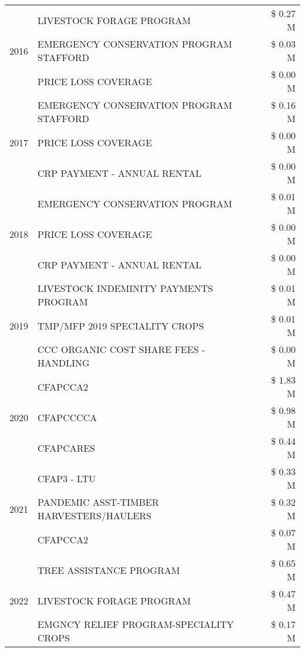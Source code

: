 \begin{tabular}{llr}
\cline{1-3}
\multirow[t]{3}{*}{2016} & LIVESTOCK FORAGE PROGRAM & \$ 0.27 M \\
 & EMERGENCY CONSERVATION PROGRAM STAFFORD & \$ 0.03 M \\
 & PRICE LOSS COVERAGE & \$ 0.00 M \\
\cline{1-3}
\multirow[t]{3}{*}{2017} & EMERGENCY CONSERVATION PROGRAM STAFFORD & \$ 0.16 M \\
 & PRICE LOSS COVERAGE & \$ 0.00 M \\
 & CRP PAYMENT - ANNUAL RENTAL & \$ 0.00 M \\
\cline{1-3}
\multirow[t]{3}{*}{2018} & EMERGENCY CONSERVATION PROGRAM & \$ 0.01 M \\
 & PRICE LOSS COVERAGE & \$ 0.00 M \\
 & CRP PAYMENT - ANNUAL RENTAL & \$ 0.00 M \\
\cline{1-3}
\multirow[t]{3}{*}{2019} & LIVESTOCK INDEMINITY PAYMENTS PROGRAM & \$ 0.01 M \\
 & TMP/MFP 2019 SPECIALITY CROPS & \$ 0.01 M \\
 & CCC ORGANIC COST SHARE FEES - HANDLING & \$ 0.00 M \\
\cline{1-3}
\multirow[t]{3}{*}{2020} & CFAPCCA2 & \$ 1.83 M \\
 & CFAPCCCCA & \$ 0.98 M \\
 & CFAPCARES & \$ 0.44 M \\
\cline{1-3}
\multirow[t]{3}{*}{2021} & CFAP3 - LTU & \$ 0.33 M \\
 & PANDEMIC ASST-TIMBER HARVESTERS/HAULERS & \$ 0.32 M \\
 & CFAPCCA2 & \$ 0.07 M \\
\cline{1-3}
\multirow[t]{3}{*}{2022} & TREE ASSISTANCE PROGRAM & \$ 0.65 M \\
 & LIVESTOCK FORAGE PROGRAM & \$ 0.47 M \\
 & EMGNCY RELIEF PROGRAM-SPECIALITY CROPS & \$ 0.17 M \\
\cline{1-3}
\bottomrule
\end{tabular}
